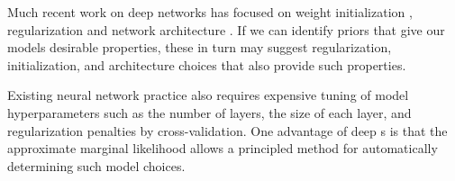 Much recent work on deep networks has focused on weight initialization \citep{martens2010deep}, regularization \citep{lee2007sparse} and network architecture \citep{gens2013learning}.
If we can identify priors that give our models desirable properties, these in turn may suggest regularization, initialization, and architecture choices that also provide such properties.

Existing neural network practice also requires expensive tuning of model hyperparameters such as the number of layers, the size of each layer, and regularization penalties by cross-validation.
One advantage of deep \gp{}s is that the approximate marginal likelihood allows a principled method for automatically determining such model choices.





